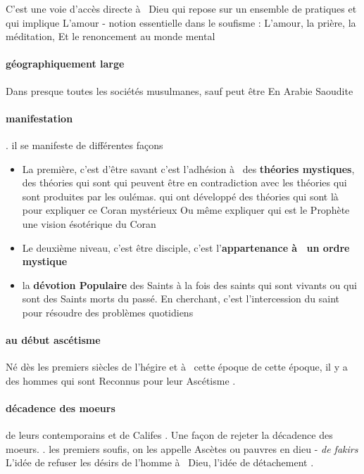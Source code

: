 \begin{Def}[soufisme]
    C'est une voie d'accès directe à  Dieu qui  repose sur un ensemble de 
pratiques et qui  implique 
L'amour  - notion essentielle dans le soufisme :  
L'amour, la prière, la méditation, 
Et le renoncement au monde mental
\end{Def}
 
 \paragraph{géographiquement large}
Dans presque toutes les sociétés musulmanes, sauf peut être 
En Arabie Saoudite  

\paragraph{manifestation}
 . il se manifeste de différentes façons 
\begin{itemize}
    \item La première, c'est d'être savant c'est l'adhésion à  des \textbf{théories mystiques},  des théories qui  sont 
qui  peuvent être en contradiction 
avec les théories qui  sont produites par les oulémas. qui  ont développé des théories qui  sont là  pour expliquer 
ce Coran mystérieux 
Ou même expliquer qui  est le 
Prophète   une vision ésotérique 
du Coran 
\item Le deuxième niveau, c'est être disciple, c'est l'\textbf{appartenance à  un ordre mystique}
\item la \textbf{dévotion 
Populaire} des Saints 
à  la fois des saints qui  sont vivants ou qui  sont des 
Saints morts du passé.  En cherchant, c'est l'intercession du saint pour résoudre des problèmes quotidiens 
\end{itemize}


\paragraph{au début ascétisme}   
Né dès les premiers siècles de l'hégire et à  cette époque de cette époque, il y a des hommes qui  sont 
Reconnus pour leur 
Ascétisme . 

\paragraph{décadence des moeurs}
   de leurs contemporains et de 
Califes .
Une façon de rejeter la décadence 
des moeurs.   . les premiers soufis, on les appelle 
Ascètes ou pauvres en dieu  - \textit{
de fakirs 
} L'idée de refuser les désirs de l'homme à  Dieu, l'idée de détachement .

